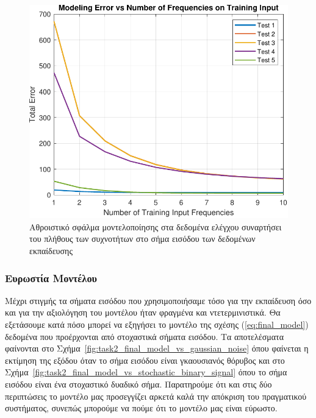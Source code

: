 \documentclass[a4paper,12pt]{article}
\begin{document}
\begin{figure}
    \centering
    \includegraphics[width=0.5\linewidth]{plot/task2_error_vs_training_input_complexity.pdf}
    \caption{Αθροιστικό σφάλμα μοντελοποίησης στα δεδομένα ελέγχου συναρτήσει του πλήθους των συχνοτήτων 
    στο σήμα εισόδου των δεδομένων εκπαίδευσης}
    \label{fig:task2_error_vs_training_input_complexity}
\end{figure}

\subsubsection*{Ευρωστία Μοντέλου}
Μέχρι στιγμής τα σήματα εισόδου που χρησιμοποιήσαμε τόσο για την εκπαίδευση όσο και για την αξιολόγηση του
μοντέλου ήταν φραγμένα και ντετερμινιστικά. Θα εξετάσουμε κατά πόσο μπορεί να εξηγήσει το μοντέλο της
σχέσης (\ref{eq:final_model}) δεδομένα που προέρχονται από στοχαστικά σήματα εισόδου. Τα αποτελέσματα
φαίνονται στο Σχήμα~\ref{fig:task2_final_model_vs_gaussian_noise} όπου φαίνεται η εκτίμηση της εξόδου
όταν το σήμα εισόδου είναι γκαουσιανός θόρυβος και στο 
Σχήμα~\ref{fig:task2_final_model_vs_stochastic_binary_signal} όπου το σήμα εισόδου είναι ένα στοχαστικό
δυαδικό σήμα. Παρατηρούμε ότι και στις δύο περιπτώσεις το μοντέλο μας προσεγγίζει αρκετά καλά την απόκριση
του πραγματικού συστήματος, συνεπώς μπορούμε να πούμε ότι το μοντέλο μας είναι εύρωστο.
\end{document}
